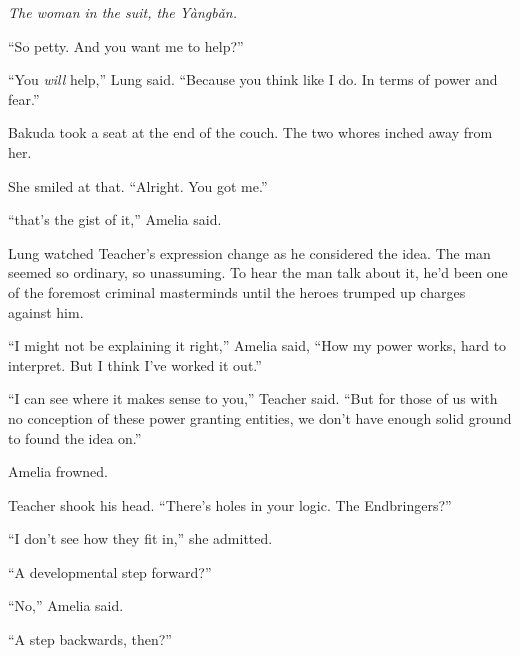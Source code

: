 \emph{The woman in the suit, the Y\`{a}ngb\v{a}n.}



``So petty.  And you want me to help?''



``You \emph{will} help,'' Lung said.  ``Because you think like I do.  In terms of power and fear.''



Bakuda took a seat at the end of the couch.  The two whores inched away from her.



She smiled at that.  ``Alright.  You got me.''



\blacksquare






``\ldotsand that's the gist of it,'' Amelia said.



Lung watched Teacher's expression change as he considered the idea.  The man seemed so ordinary, so unassuming.  To hear the man talk about it, he'd been one of the foremost criminal masterminds until the heroes trumped up charges against him.



``I might not be explaining it right,'' Amelia said, ``How my power works, hard to interpret.  But I think I've worked it out.''



``I can see where it makes sense to you,'' Teacher said.  ``But for those of us with no conception of these power granting entities, we don't have enough solid ground to found the idea on.''



Amelia frowned.



Teacher shook his head.  ``There's holes in your logic.  The Endbringers?''



``I don't see how they fit in,'' she admitted.



``A developmental step forward?''



``No,'' Amelia said.



``A step backwards, then?''



